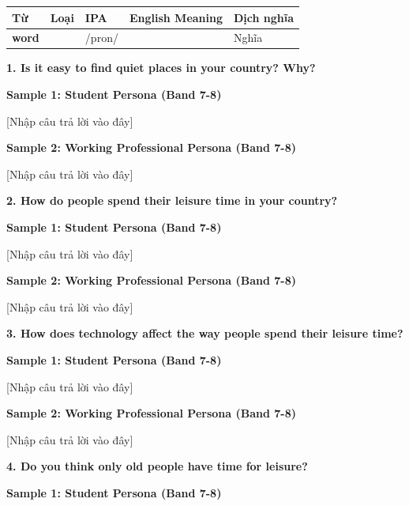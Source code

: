 \vspace{0.8em}
\begin{center}
\renewcommand{\arraystretch}{1.65}
\begin{tabularx}{\textwidth}{|V{0.22\textwidth}|C{0.07\textwidth}|I{0.20\textwidth}|Y|V{0.18\textwidth}|}
\hline
{}
\textbf{Từ} & \textbf{Loại} & \textbf{IPA} & \textbf{English Meaning} & \textbf{Dịch nghĩa} \\
\hline
\textbf{word} & & /pron/ & & Nghĩa \\ \hline
\end{tabularx}
\end{center}

\partthreeheader

\begin{ieltsquestion}
\textbf{1. Is it easy to find quiet places in your country? Why?}
\end{ieltsquestion}
\textbf{Sample 1: Student Persona (Band 7-8)}

[Nhập câu trả lời vào đây]

\textbf{Sample 2: Working Professional Persona (Band 7-8)}

[Nhập câu trả lời vào đây]

\separator

\begin{ieltsquestion}
\textbf{2. How do people spend their leisure time in your country?}
\end{ieltsquestion}
\textbf{Sample 1: Student Persona (Band 7-8)}

[Nhập câu trả lời vào đây]

\textbf{Sample 2: Working Professional Persona (Band 7-8)}

[Nhập câu trả lời vào đây]

\separator

\begin{ieltsquestion}
\textbf{3. How does technology affect the way people spend their leisure time?}
\end{ieltsquestion}
\textbf{Sample 1: Student Persona (Band 7-8)}

[Nhập câu trả lời vào đây]

\textbf{Sample 2: Working Professional Persona (Band 7-8)}

[Nhập câu trả lời vào đây]

\separator

\begin{ieltsquestion}
\textbf{4. Do you think only old people have time for leisure?}
\end{ieltsquestion}
\textbf{Sample 1: Student Persona (Band 7-8)}

